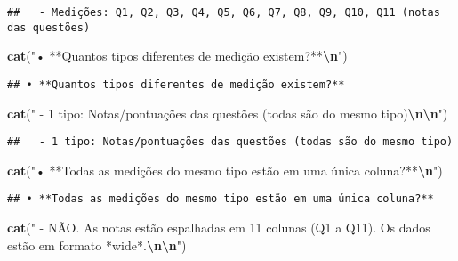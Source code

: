 \documentclass[
]{article}
\newenvironment{Shaded}{\begin{snugshade}}{\end{snugshade}}
\newcommand{\FunctionTok}[1]{\textcolor[rgb]{0.13,0.29,0.53}{\textbf{#1}}}
\newcommand{\NormalTok}[1]{#1}
\newcommand{\SpecialCharTok}[1]{\textcolor[rgb]{0.81,0.36,0.00}{\textbf{#1}}}
\newcommand{\StringTok}[1]{\textcolor[rgb]{0.31,0.60,0.02}{#1}}
\begin{document}
\begin{verbatim}
##   - Medições: Q1, Q2, Q3, Q4, Q5, Q6, Q7, Q8, Q9, Q10, Q11 (notas das questões)
\end{verbatim}

\begin{Shaded}
\begin{Highlighting}[]
\FunctionTok{cat}\NormalTok{(}\StringTok{"• **Quantos tipos diferentes de medição existem?**}\SpecialCharTok{\textbackslash{}n}\StringTok{"}\NormalTok{)}
\end{Highlighting}
\end{Shaded}

\begin{verbatim}
## • **Quantos tipos diferentes de medição existem?**
\end{verbatim}

\begin{Shaded}
\begin{Highlighting}[]
\FunctionTok{cat}\NormalTok{(}\StringTok{"  {-} 1 tipo: Notas/pontuações das questões (todas são do mesmo tipo)}\SpecialCharTok{\textbackslash{}n\textbackslash{}n}\StringTok{"}\NormalTok{)}
\end{Highlighting}
\end{Shaded}

\begin{verbatim}
##   - 1 tipo: Notas/pontuações das questões (todas são do mesmo tipo)
\end{verbatim}

\begin{Shaded}
\begin{Highlighting}[]
\FunctionTok{cat}\NormalTok{(}\StringTok{"• **Todas as medições do mesmo tipo estão em uma única coluna?**}\SpecialCharTok{\textbackslash{}n}\StringTok{"}\NormalTok{)}
\end{Highlighting}
\end{Shaded}

\begin{verbatim}
## • **Todas as medições do mesmo tipo estão em uma única coluna?**
\end{verbatim}

\begin{Shaded}
\begin{Highlighting}[]
\FunctionTok{cat}\NormalTok{(}\StringTok{"  {-} NÃO. As notas estão espalhadas em 11 colunas (Q1 a Q11). Os dados estão em formato *wide*.}\SpecialCharTok{\textbackslash{}n\textbackslash{}n}\StringTok{"}\NormalTok{)}
\end{Highlighting}
\end{Shaded}
\end{document}
